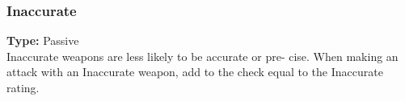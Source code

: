 \subsubsection{Inaccurate}
\label{iqty:inaccurate}
\textbf{Type:} Passive\\
Inaccurate weapons are less likely to be accurate or pre-
cise. When making an attack with an Inaccurate weapon,
add \setback to the check equal to the Inaccurate rating.
